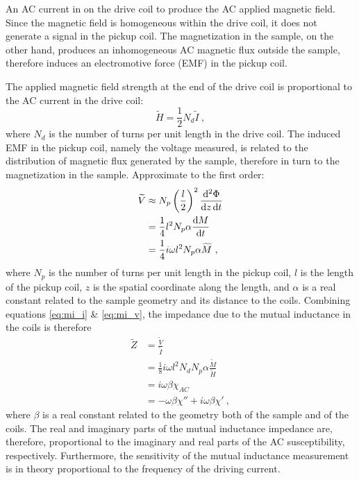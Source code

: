 An AC current in on the drive coil to produce the AC applied magnetic field. Since the magnetic field is homogeneous within the drive coil, it does not generate a signal in the pickup coil. The magnetization in the sample, on the other hand, produces an inhomogeneous AC magnetic flux outside the sample, therefore induces an electromotive force (EMF) in the pickup coil.

The applied magnetic field strength at the end of the drive coil is proportional to the AC current in the drive coil:%
\begin{equation}%
    \widetilde{H} = \frac{1}{2}N_d\widetilde{I}~,\label{eq:mi_i}
\end{equation}%
where $N_d$ is the number of turns per unit length in the drive coil. The induced EMF in the pickup coil, namely the voltage measured, is related to the distribution of magnetic flux generated by the sample, therefore in turn to the magnetization in the sample. Approximate to the first order:%
\begin{align}%
    \widetilde{V} &\approx N_p\left(\frac{l}{2}\right)^2 \frac{\diff^2 \Phi}{\diff z \diff t}\nonumber\\
        &= \frac{1}{4}l^2N_p\alpha \frac{\diff M}{\diff t}\nonumber\\
        &= \frac{1}{4}i\omega l^2 N_p \alpha \widetilde{M}~,\label{eq:mi_v}
\end{align}%
where $N_p$ is the number of turns per unit length in the pickup coil, $l$ is the length of the pickup coil, $z$ is the spatial coordinate along the length, and $\alpha$ is a real constant related to the sample geometry and its distance to the coils. Combining equations \ref{eq:mi_i} \& \ref{eq:mi_v}, the impedance due to the mutual inductance in the coils is therefore%
\begin{align}%
    \widetilde{Z} &= \frac{\widetilde{V}}{\widetilde{I}}\nonumber\\
        &= \frac{1}{8}i\omega l^2 N_d N_p \alpha \frac{\widetilde{M}}{\widetilde{H}}\nonumber\\
        &= i\omega\beta\chi_{AC}\nonumber\\
        &= -\omega\beta\chi'' + i\omega\beta\chi'\label{eq:mi_z}~,
\end{align}%
where $\beta$ is a real constant related to the geometry both of the sample and of the coils. The real and imaginary parts of the mutual inductance impedance are, therefore, proportional to the imaginary and real parts of the AC susceptibility, respectively. Furthermore, the sensitivity of the mutual inductance measurement is in theory proportional to the frequency of the driving current.

